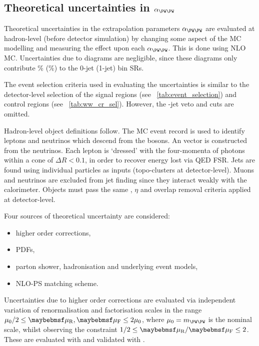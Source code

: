 \subsection{Theoretical uncertainties in $\alpha_{\WW}$}
\label{sec:ww_bkg:alpha}

Theoretical uncertainties in the extrapolation parameters $\alpha_{\WW}$ are evaluated 
at hadron-level (\ie before detector simulation) by changing some aspect of the MC 
modelling and measuring the effect upon each $\alpha_{\WW}$. This is done using NLO \WW 
MC. Uncertainties due to \ggWW diagrams are negligible, since these diagrams only 
contribute \% (\%) to the 0-jet (1-jet) bin SRs.

The event selection criteria used in evaluating the uncertainties is similar to the 
detector-level selection of the signal regions (see \Table~\ref{tab:event_selection}) 
and control regions (see \Table~\ref{tab:ww_cr_sel}). However, the \Pbottom-jet veto and 
\frecoil cuts are omitted.

Hadron-level object definitions follow. The MC event record is used to identify leptons 
and neutrinos which descend from the \PW bosons. An \metvec vector is constructed from 
the neutrinos. Each lepton is `dressed' with the four-momenta of photons within a cone of 
$\Delta R < 0.1$, in order to recover energy lost via QED FSR. Jets are found using 
individual particles as inputs (\cf topo-clusters at detector-level). Muons and neutrinos 
are excluded from jet finding since they interact weakly with the calorimeter. Objects 
must pass the same \pt, $\eta$ and overlap removal criteria applied at detector-level.

Four sources of theoretical uncertainty are considered:
\begin{itemize}[noitemsep,nolistsep]
	\item higher order corrections,
	\item \acp{PDF},
	\item parton shower, hadronisation and underlying event models,
	\item NLO-PS matching scheme.
\end{itemize}

Uncertainties due to higher order corrections are evaluated via independent variation of 
renormalisation and factorisation scales in the range $\mu_0/2 \leq \mur,\muf 
\leq 2\mu_0$, where $\mu_0 = m_{\WW}$ is the nominal scale, whilst observing the 
constraint $1/2 \leq \mur/\muf \leq 2$. These are evaluated with \amcatnlo and validated 
with \mcfm.

